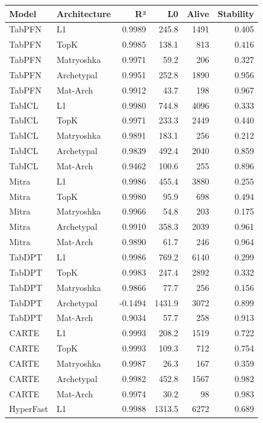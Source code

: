 \begin{table}[h]
\centering
\small
\begin{tabular}{llrrrr}
\toprule
Model & Architecture & R² & L0 & Alive & Stability \\
\midrule
TabPFN & L1 & 0.9989 & 245.8 & 1491 & 0.405 \\
TabPFN & TopK & 0.9985 & 138.1 & 813 & 0.416 \\
TabPFN & Matryoshka & 0.9971 & 59.2 & 206 & 0.327 \\
TabPFN & Archetypal & 0.9951 & 252.8 & 1890 & 0.956 \\
TabPFN & Mat-Arch & 0.9912 & 43.7 & 198 & 0.967 \\
\midrule
TabICL & L1 & 0.9980 & 744.8 & 4096 & 0.333 \\
TabICL & TopK & 0.9971 & 233.3 & 2449 & 0.440 \\
TabICL & Matryoshka & 0.9891 & 183.1 & 256 & 0.212 \\
TabICL & Archetypal & 0.9839 & 492.4 & 2040 & 0.859 \\
TabICL & Mat-Arch & 0.9462 & 100.6 & 255 & 0.896 \\
\midrule
Mitra & L1 & 0.9986 & 455.4 & 3880 & 0.255 \\
Mitra & TopK & 0.9980 & 95.9 & 698 & 0.494 \\
Mitra & Matryoshka & 0.9966 & 54.8 & 203 & 0.175 \\
Mitra & Archetypal & 0.9910 & 358.3 & 2039 & 0.961 \\
Mitra & Mat-Arch & 0.9890 & 61.7 & 246 & 0.964 \\
\midrule
TabDPT & L1 & 0.9986 & 769.2 & 6140 & 0.299 \\
TabDPT & TopK & 0.9983 & 247.4 & 2892 & 0.332 \\
TabDPT & Matryoshka & 0.9866 & 77.7 & 256 & 0.156 \\
TabDPT & Archetypal & -0.1494 & 1431.9 & 3072 & 0.899 \\
TabDPT & Mat-Arch & 0.9034 & 57.7 & 258 & 0.913 \\
\midrule
CARTE & L1 & 0.9993 & 208.2 & 1519 & 0.722 \\
CARTE & TopK & 0.9993 & 109.3 & 712 & 0.754 \\
CARTE & Matryoshka & 0.9987 & 26.3 & 167 & 0.359 \\
CARTE & Archetypal & 0.9982 & 452.8 & 1567 & 0.982 \\
CARTE & Mat-Arch & 0.9974 & 30.2 & 98 & 0.983 \\
\midrule
HyperFast & L1 & 0.9988 & 1313.5 & 6272 & 0.689 \\

\end{tabular}
\end{table}
